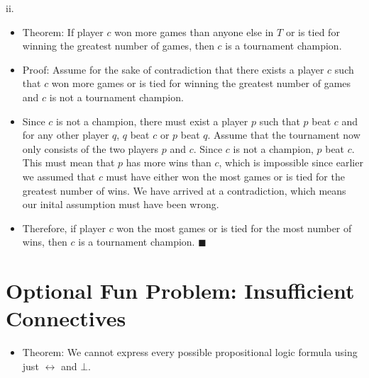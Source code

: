 \documentclass{article}
\renewcommand{\(}{\left(}
\renewcommand{\)}{\right)}
\theoremstyle{plain}
\theoremstyle{plain}
\theoremstyle{definition}
\begin{document}
    ii.
    \begin{shaded}
        \begin{itemize}
            \item 
                Theorem: If player $c$ won more games than anyone else in $T$ or is tied for winning the greatest number of games, then $c$ is a tournament champion.
            \item
                Proof: Assume for the sake of contradiction that there exists a player $c$ such that $c$ won more games or is tied for winning the greatest number of games and $c$ is not a tournament champion.
            \item 
                Since $c$ is not a champion, there must exist a player $p$ such that $p$ beat $c$ and for any other player $q$, $q$ beat $c$ or $p$ beat $q$. Assume that the tournament now only consists of the two players $p$ and $c$. Since $c$ is not a champion, $p$ beat $c$. This must mean that $p$ has more wins than $c$, which is impossible since earlier we assumed that $c$ must have either won the most games or is tied for the greatest number of wins. We have arrived at a contradiction, which means our inital assumption must have been wrong.
            \item 
                Therefore, if player $c$ won the most games or is tied for the most number of wins, then $c$ is a tournament champion. $\blacksquare$
        \end{itemize}
    \end{shaded}
    
\newpage

\section*{Optional Fun Problem: Insufficient Connectives}

\begin{shaded}
    \begin{itemize}
        \item 
            Theorem: We cannot express every possible propositional logic formula using just $\leftrightarrow$ and $\bot$.
    \end{itemize}
\end{shaded}
    
\end{document}

